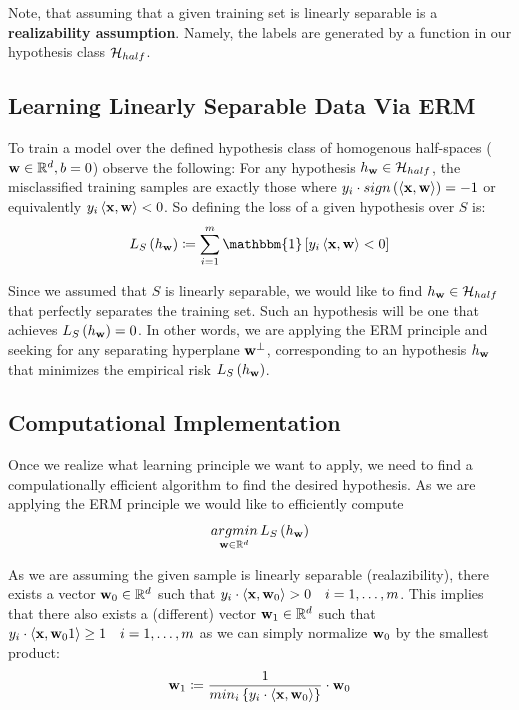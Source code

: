 Note, that assuming that a given training set is linearly separable is a \textbf{realizability assumption}. Namely, the labels are generated by a function in our hypothesis class $\mathcal{H}_{half}$.

\subsection{Learning Linearly Separable Data Via ERM}
To train a model over the defined hypothesis class of homogenous half-spaces ($\mathbf{w}\in\mathbb{R}^d, b=0$) observe the following: For any hypothesis $h_{\mathbf{w}}\in \mathcal{H}_{half}$, the misclassified training samples are exactly those where $y_i\cdot sign\left(\left\langle \mathbf{x},\mathbf{w}\right\rangle\right)=-1$ or equivalently $y_i\left\langle \mathbf{x},\mathbf{w}\right\rangle<0$. So defining the loss of a given hypothesis over $S$ is: $$ L_S\left(h_\w\right)\coloneqq\sum^m_{i=1}\mathbbm{1}\left[y_i\inprod{\x}{\w}<0\right] $$

Since we assumed that $S$ is linearly separable, we would like to find $h_{\mathbf{w}}\in\mathcal{H}_{half}$ that perfectly separates the training set. Such an hypothesis will be one that achieves $L_S\left(h_{\mathbf{w}}\right)=0$. In other words, we are applying the ERM principle and seeking for any separating hyperplane $\mathbf{w}^\perp$, corresponding to an hypothesis $h_{\mathbf{w}}$ that minimizes the empirical risk $L_S\left(h_{\mathbf{w}}\right)$.

\subsection{Computational Implementation}
Once we realize what learning principle we want to apply, we need to find a compulationally efficient algorithm to find the desired hypothesis. As we are applying the ERM principle we would like to efficiently compute $$ \underset{\mathbf{w}\in\mathbb{R}^d}{argmin}\,L_S\left(h_{\mathbf{w}}\right) $$

As we are assuming the given sample is linearly separable (realazibility), there exists a vector $\mathbf{w}_0\in\mathbb{R}^d$ such that $ y_i\cdot\left\langle \mathbf{x},\mathbf{w}_0\right\rangle>0\quad i=1,\ldots,m $. This implies that there also exists a (different) vector $\mathbf{w}_1\in\mathbb{R}^d$ such that $ y_i\cdot\left\langle \mathbf{x},\mathbf{w}_01\right\rangle\geq 1 \quad i=1,\ldots,m $ as we can simply normalize $\mathbf{w}_0$ by the smallest product: $$ \mathbf{w}_1 \coloneqq \frac{1}{min_i\left\{y_i\cdot \left\langle \mathbf{x},\mathbf{w}_0\right\rangle\right\}}\cdot \mathbf{w}_0 $$

